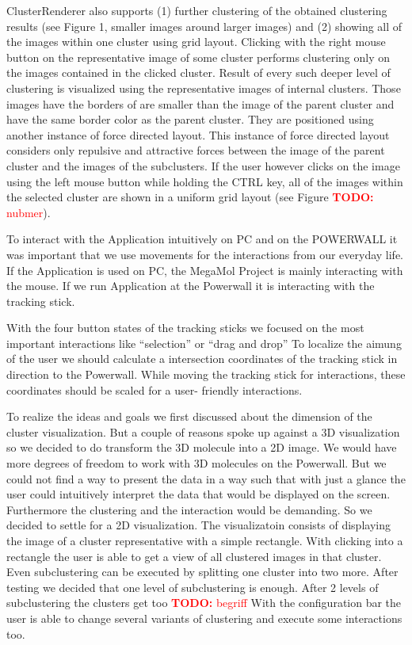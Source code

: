 \documentclass[journal]{vgtc}       %
\newcommand{\todo}[1]{\textcolor{red}{\textbf{TODO:} #1}}
\begin{document}
ClusterRenderer also supports (1) further clustering of the obtained clustering results (see Figure 1, smaller images around larger images) and (2) showing all of the images within one cluster using grid layout. Clicking with the right mouse button on the representative image of some cluster performs clustering only on the images contained in the clicked cluster. Result of every such deeper level of clustering is visualized using the representative images of internal clusters. Those images have the borders of are smaller than the image of the parent cluster and have the same border color as the parent cluster. They are positioned using another instance of force directed layout. This instance of force directed layout considers only repulsive and attractive forces between the image of the parent cluster and the images of the subclusters. If the user however clicks on the image using the left mouse button while holding the CTRL key, all of the images within the selected cluster are shown in a uniform grid layout (see Figure \todo{nubmer}). 

To interact with the Application intuitively on PC and on the POWERWALL it was important that we use movements for the interactions from our everyday life. If the Application is used on PC, the MegaMol Project is mainly interacting with the mouse. If we run Application at the Powerwall it is interacting with the tracking stick.

With the four button states of the tracking sticks we focused on the most important interactions like ``selection'' or ``drag and drop'' To localize the aimung of the user  we should calculate a intersection coordinates of the tracking stick in direction to the Powerwall. While moving the tracking stick for interactions, these coordinates should be scaled for a user- friendly interactions.



To realize the ideas and goals we first discussed about the dimension of the cluster visualization. But a couple of reasons spoke up against a 3D visualization so we decided to do transform the 3D molecule into a 2D image. We would have more degrees of freedom to work with 3D molecules on the Powerwall. But we could not find a way to present the data in a way such that with just a glance the user could intuitively interpret the data that would be displayed on the screen. Furthermore the clustering and the interaction would be demanding. So we decided to settle for a 2D visualization. 
The visualizatoin consists of displaying the image of a cluster representative with a simple rectangle. With clicking into a rectangle the user is able to get a view of all clustered images in that cluster. Even subclustering can be executed by splitting one cluster into two more. After testing we decided that one level of subclustering is enough. After 2 levels of subclustering the clusters get too  \todo{begriff}
With the configuration bar the user is able to change several variants of clustering and execute some interactions too. 
\end{document}
